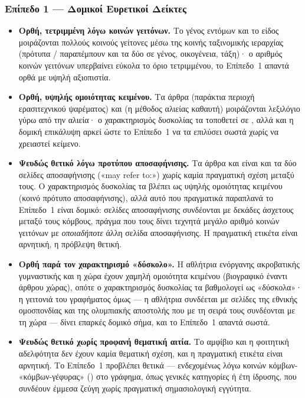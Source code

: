 \subsubsection{Επίπεδο 1 --- Δομικοί Ευρετικοί Δείκτες}

\begin{itemize}
  \item \textbf{Ορθή, τετριμμένη λόγω κοινών γειτόνων.} Το γένος εντόμων
   και το είδος  μοιράζονται πολλούς κοινούς
  γείτονες μέσω της κοινής ταξινομικής ιεραρχίας (πρότυπα /
  παραπέμπουν και τα δύο σε γένος, οικογένεια, τάξη)· ο αριθμός κοινών γειτόνων
  υπερβαίνει εύκολα το όριο τετριμμένου, το Επίπεδο~1 απαντά ορθά με υψηλή
  αξιοπιστία.
  \item \textbf{Ορθή, υψηλής ομοιότητας κειμένου.} Τα άρθρα 
  (παράκτια περιοχή ερασιτεχνικού ψαρέματος) και  (η μέθοδος αλιείας
  καθαυτή) μοιράζονται λεξιλόγιο γύρω από την αλιεία· ο χαρακτηρισμός δυσκολίας
  τα τοποθετεί σε , αλλά και η δομική επικάλυψη αρκεί ώστε
  το Επίπεδο~1 να τα επιλύσει σωστά χωρίς να χρειαστεί κείμενο.
  \item \textbf{Ψευδώς θετικό λόγω προτύπου αποσαφήνισης.} Τα άρθρα  και  είναι και τα δύο σελίδες αποσαφήνισης («may refer
  to:») χωρίς καμία πραγματική σχέση μεταξύ τους. Ο χαρακτηρισμός δυσκολίας τα
  βλέπει ως υψηλής ομοιότητας κειμένου (κοινό πρότυπο αποσαφήνισης), αλλά αυτό
  που πραγματικά παραπλανά το Επίπεδο~1 είναι δομικό: σελίδες αποσαφήνισης
  συνδέονται με δεκάδες άσχετους μεταξύ τους κόμβους, πράγμα που τους δίνει
  τεχνητά μεγάλο αριθμό κοινών γειτόνων με \textit{οποιαδήποτε} άλλη σελίδα
  αποσαφήνισης. Η πραγματική ετικέτα είναι αρνητική, η πρόβλεψη θετική.
  \item \textbf{Ορθή παρά τον χαρακτηρισμό «δύσκολο».} Η αθλήτρια ενόργανης
  ακροβατικής γυμναστικής  και η χώρα 
  έχουν χαμηλή ομοιότητα κειμένου (βιογραφικό έναντι άρθρου χώρας), οπότε ο
  χαρακτηρισμός δυσκολίας τα βαθμολογεί ως «δύσκολα»· η γειτονιά του γραφήματος όμως
  --- η αθλήτρια συνδέεται με σελίδες της εθνικής ομοσπονδίας και της
  ολυμπιακής αποστολής που με τη σειρά τους συνδέονται με τη χώρα --- δίνει
  επαρκές δομικό σήμα, και το Επίπεδο~1 απαντά σωστά.
  \item \textbf{Ψευδώς θετικό χωρίς προφανή θεματική αιτία.} Το αμφίβιο
   και η φοιτητική αδελφότητα  δεν έχουν καμία θεματική σχέση, και η πραγματική ετικέτα είναι
  αρνητική. Το Επίπεδο~1 προβλέπει θετικά --- ενδεχομένως λόγω κοινών κόμβων-
  «κόμβων-γέφυρας» () στο γράφημα, όπως γενικές κατηγορίες ή έτη ίδρυσης,
  που συνδέουν έμμεσα ζεύγη χωρίς πραγματική σημασιολογική εγγύτητα.
\end{itemize}

